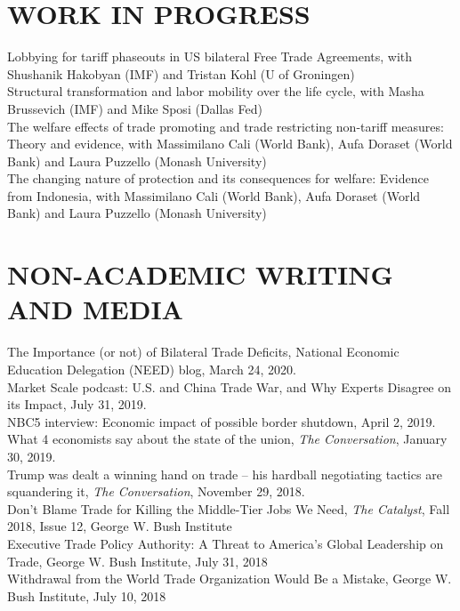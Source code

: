 \documentclass[11pt]{res}
\begin{document}
\begin{resume}
\section{WORK IN PROGRESS}\vspace{1.5mm}
Lobbying for tariff phaseouts in US bilateral Free Trade Agreements, with Shushanik Hakobyan (IMF) and Tristan Kohl (U of Groningen)\vspace{1.5mm}\\
Structural transformation and labor mobility over the life cycle, with Masha Brussevich (IMF) and Mike Sposi (Dallas Fed)\vspace{1.5mm}\\
The welfare effects of trade promoting and trade restricting non-tariff measures: Theory and evidence, with Massimilano Cali (World Bank), Aufa Doraset (World Bank) and Laura Puzzello (Monash University)\vspace{1.5mm}\\
The changing nature of protection and its consequences for welfare: Evidence from Indonesia, with Massimilano Cali (World Bank), Aufa Doraset (World Bank) and Laura Puzzello (Monash University)


\section{NON-ACADEMIC WRITING AND MEDIA}\vspace{1.5mm}
The Importance (or not) of Bilateral Trade Deficits, National Economic Education Delegation (NEED) blog, March 24, 2020.\vspace{1.5mm}\\
Market Scale podcast: U.S. and China Trade War, and Why Experts Disagree on its Impact, July 31, 2019.\vspace{1.5mm}\\
NBC5 interview: Economic impact of possible border shutdown, April 2, 2019.\vspace{1.5mm}\\
What 4 economists say about the state of the union, \emph{The Conversation}, January 30, 2019.\vspace{1.5mm}\\
Trump was dealt a winning hand on trade – his hardball negotiating tactics are squandering it, \emph{The Conversation}, November 29, 2018.\vspace{1.5mm}\\
Don't Blame Trade for Killing the Middle-Tier Jobs We Need, \emph{The Catalyst}, Fall 2018, Issue 12, George W. Bush Institute\vspace{1.5mm}\\
Executive Trade Policy Authority: A Threat to America’s Global Leadership on Trade, George W. Bush Institute, July 31, 2018\vspace{1.5mm}\\
Withdrawal from the World Trade Organization Would Be a Mistake, George W. Bush Institute, July 10, 2018





\end{resume}
\end{document}
